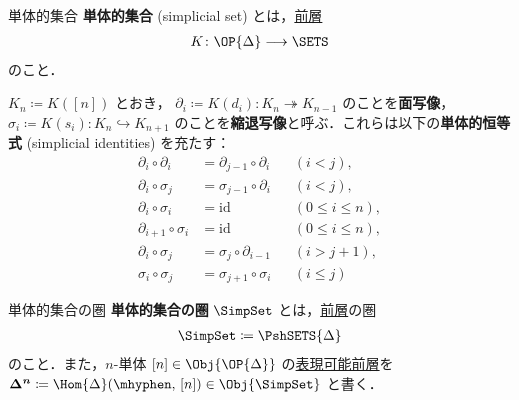 \documentclass[TQFT_main]{subfiles}
\begin{document}
\begin{mydef}[label=def:simplicial-sets,breakable]{単体的集合}
    \textbf{単体的集合} (simplicial set)  とは，\hyperref[def:presheaf-general]{前層}
    \begin{align}
        K \colon \OP{\Delta} \lto \SETS
    \end{align}
    のこと．

    \tcblower

    $K_n \coloneqq K([n])$ とおき，
    $\partial_i \coloneqq K(d_i) \colon K_{n} \twoheadrightarrow K_{n-1}$ のことを\textbf{面写像}，$\sigma_i \coloneqq K(s_i) \colon K_n \hookrightarrow K_{n+1}$ のことを\textbf{縮退写像}と呼ぶ．これらは以下の\textbf{単体的恒等式} (simplicial identities) を充たす：
    \begin{align}
        \partial_i \circ \partial_i &= \partial_{j-1} \circ \partial_i&& (i<j), \\
        \partial_i \circ \sigma_j &= \sigma_{j-1} \circ \partial_i && (i<j), \\
        \partial_i \circ \sigma_i &= \mathrm{id} &&(0\le i \le n), \\
        \partial_{i+1} \circ \sigma_i &= \mathrm{id} &&(0\le i \le n), \\
        \partial_i \circ \sigma_j &= \sigma_j \circ \partial_{i-1} &&(i > j+1), \\
        \sigma_i \circ \sigma_j &= \sigma_{j+1} \circ \sigma_i &&(i \le j)
    \end{align}
\end{mydef}

\begin{mydef}[label=def:SimpSet]{単体的集合の圏}
    \textbf{単体的集合の圏} $\SimpSet$ とは，\hyperref[def:presheaf-general]{前層}の圏
    \begin{align}
        \SimpSet \coloneqq \PshSETS{\Delta}
    \end{align}
    のこと．また，$n$-単体 $[n] \in \Obj{\OP{\Delta}}$ の\hyperref[def:representable]{表現可能前層}を $\bm{\Delta^n} \coloneqq \Hom{\Delta} (\mhyphen,\, [n]) \in \Obj{\SimpSet}$ と書く．
\end{mydef}
\end{document}
